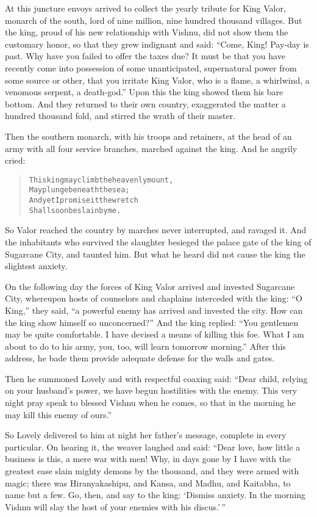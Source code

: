 \documentclass[article, twoside, 14pt]{memoir}
\renewenvironment{verbatim}{%
\begin{quote}%
\vskip -10pt%
\begin{alltt}\normalfont\large}{\end{alltt}%
\end{quote}%
\vskip -10pt
} %
\begin{document}
At this juncture envoys arrived to collect the yearly tribute for
King Valor, monarch of the south, lord of nine million, nine
hundred thousand villages. But the king, proud of his new
relationship with Vishnu, did not show them the customary honor, so
that they grew indignant and said:
``Come, King! Pay-day is past. Why have you failed to offer the taxes due? It must be that you have recently come into possession of some unanticipated, supernatural power from some source or other, that you irritate King Valor, who is a flame, a whirlwind, a venomous serpent, a death-god.''
Upon this the king showed them his bare bottom. And they returned
to their own country, exaggerated the matter a hundred thousand
fold, and stirred the wrath of their master.

Then the southern monarch, with his troops and retainers, at the
head of an army with all four service branches, marched against the
king. And he angrily cried:

\begin{verbatim}
This king may climb the heavenly mount,
    May plunge beneath the sea;
And yet{\textemdash}I promise it{\textemdash}the wretch
    Shall soon be slain by me.
\end{verbatim}
So Valor reached the country by marches never interrupted, and
ravaged it. And the inhabitants who survived the slaughter besieged
the palace gate of the king of Sugarcane City, and taunted him. But
what he heard did not cause the king the slightest anxiety.

On the following day the forces of King Valor arrived and invested
Sugarcane City, whereupon hosts of counselors and chaplains
interceded with the king: ``O King,'' they said,
``a powerful enemy has arrived and invested the city. How can the king show himself so unconcerned?''
And the king replied:
``You gentlemen may be quite comfortable. I have devised a means of killing this foe. What I am about to do to his army, you, too, will learn tomorrow morning.''
 After this address, he bade them provide adequate defense for
the walls and gates.

Then he summoned Lovely and with respectful coaxing said:
``Dear child, relying on your husband's power, we have begun hostilities with the enemy. This very night pray speak to blessed Vishnu when he comes, so that in the morning he may kill this enemy of ours.''

So Lovely delivered to him at night her father's message, complete
in every particular. On hearing it, the weaver laughed and said:
``Dear love, how little a business is this, a mere war with men! Why, in days gone by I have with the greatest ease slain mighty demons by the thousand, and they were armed with magic; there was Hiranyakashipu, and Kansa, and Madhu, and Kaitabha, to name but a few. Go, then, and say to the king: `Dismiss anxiety. In the morning Vishnu will slay the host of your enemies with his discus.'\,''
\end{document}
